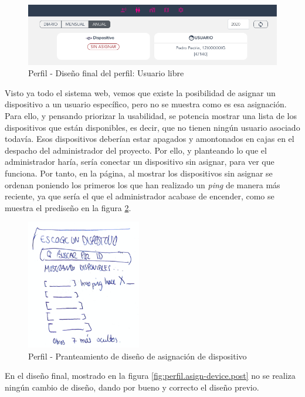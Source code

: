 \begin{enumerate}
    \begin{figure}[H]   
        \centering
        \includegraphics[width=12cm]{./img/web/perfil/stats.user.no-device.png}
        \caption{Perfil - Diseño final del perfil: Usuario libre}
        \label{fig:perfil.userlibre.post}
    \end{figure}
    
    Visto ya todo el sistema web, vemos que existe la posibilidad de asignar un dispositivo a un usuario específico, pero no se muestra como es esa asignación. Para ello, y pensando priorizar la usabilidad, se potencia mostrar una lista de los dispositivos que están disponibles, es decir, que no tienen ningún usuario asociado todavía. Esos dispositivos deberían estar apagados y amontonados en cajas en el despacho del administrador del proyecto. Por ello, y planteando lo que el administrador haría, sería conectar un dispositivo sin asignar, para ver que funciona. Por tanto, en la página, al mostrar los dispositivos sin asignar se ordenan poniendo los primeros los que han realizado un \textit{ping} de manera más reciente, ya que sería el que el administrador acabase de encender, como se muestra el prediseño en la figura \ref{fig:perfil.asign-device.pre}.
    
    \begin{figure}[H]   
        \centering
        \includegraphics[width=5cm]{./img/web/perfil/stats.assign.png}
        \caption{Perfil - Pranteamiento de diseño de asignación de dispositivo}
        \label{fig:perfil.asign-device.pre}
    \end{figure}
    
    En el diseño final, mostrado en la figura \ref{fig:perfil.asign-device.post} no se realiza ningún cambio de diseño, dando por bueno y correcto el diseño previo.
    

\end{enumerate}
